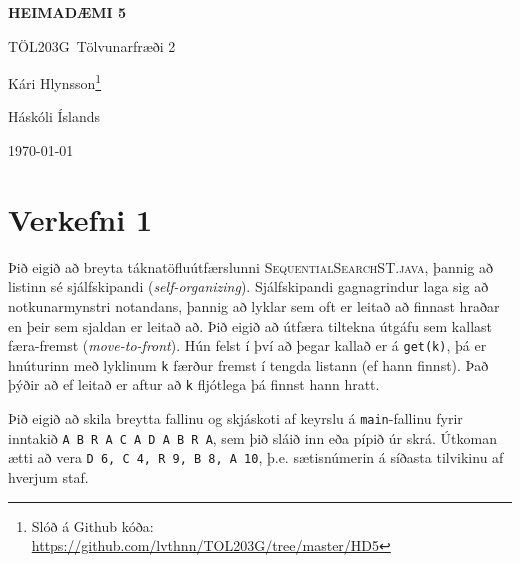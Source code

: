 \documentclass[12pt, a4paper, hidelinks]{article}
\newcommand{\doctitle}{\uppercase{Heimadæmi 5}}
\newcommand{\coursename}{Tölvunarfræði 2}
\newcommand{\coursenum}{TÖL203G}
\begin{document}
\thispagestyle{plain}
\centerline{\bfseries\Large\doctitle}
\medskip
\centerline{\large\coursenum\ \coursename}
\bigskip

\centerline{\large Kári Hlynsson\footnote{Slóð á Github kóða: \url{https://github.com/lvthnn/TOL203G/tree/master/HD5}}}
\bigskip
\centerline{Háskóli Íslands}
\medskip
\centerline{\today}

\section*{Verkefni 1}
Þið eigið að breyta táknatöfluútfærslunni \textsc{SequentialSearchST.java}, þannig að
listinn sé sjálfskipandi (\emph{self-organizing}). Sjálfskipandi gagnagrindur laga sig
að notkunarmynstri notandans, þannig að lyklar sem oft er leitað að finnast hraðar en
þeir sem sjaldan er leitað að. Þið eigið að útfæra tiltekna útgáfu sem kallast færa-fremst
(\emph{move-to-front}). Hún felst í því að þegar kallað er á \texttt{get(k)}, þá er hnúturinn
með lyklinum \texttt{k} færður fremst í tengda listann (ef hann finnst). Það þýðir að ef leitað
er aftur að \texttt{k} fljótlega þá finnst hann hratt.

Þið eigið að skila breytta fallinu  og skjáskoti af keyrslu á \texttt{main}-fallinu fyrir
inntakið \texttt{A B R A C A D A B R A}, sem þið sláið inn eða pípið úr skrá. Útkoman ætti að vera
\texttt{D 6, C 4, R 9, B 8, A 10}, þ.e. sætisnúmerin á síðasta tilvikinu af hverjum staf.
\end{document}
